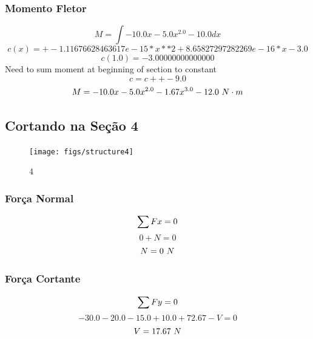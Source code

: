 \documentclass[a4paper,12pt]{article}%
\begin{document}
%
\subsubsection{Momento Fletor}%
\label{ssubsec:MomentoFletor}%
\begin{dmath*}%
M = \int- 10.0 x - 5.0 x^{2.0} - 10.0 dx%
\end{dmath*}%
\begin{dmath*}%
c(x) = +-1.11676628463617e-15*x**2 + 8.65827297282269e-16*x - 3.0%
\end{dmath*}%
\begin{dmath*}%
c(1.0) = -3.00000000000000%
\end{dmath*}%
Need to sum moment at beginning of section to constant%
\begin{dmath*}%
c = c + +-9.0%
\end{dmath*}%
\begin{dmath*}%
M = - 10.0 x - 5.0 x^{2.0} - 1.67 x^{3.0} - 12.0$ $N \cdot m%
\end{dmath*}

%
\subsection{Cortando na Seção 4}%
\label{subsec:CortandonaSeo4}%


\begin{figure}[H]%
\centering%
\texttt{[image: figs/structure4]}%
\caption{\label{fig:secoes}\label{fig:secoes} 4}%
\end{figure}

%
\subsubsection{Força Normal}%
\label{ssubsec:ForaNormal}%
\begin{dmath*}%
\sum{Fx} = 0 \\%
\end{dmath*}%
\begin{dmath*}%
0 + N = 0%
\end{dmath*}%
\begin{dmath*}%
N = 0$ $N%
\end{dmath*}

%
\subsubsection{Força Cortante}%
\label{ssubsec:ForaCortante}%
\begin{dmath*}%
\sum{Fy} = 0 \\%
\end{dmath*}%
\begin{dmath*}%
-30.0 - 20.0 - 15.0 + 10.0 + 72.67 - V = 0%
\end{dmath*}%
\begin{dmath*}%
V = 17.67$ $N%
\end{dmath*}
\end{document}
